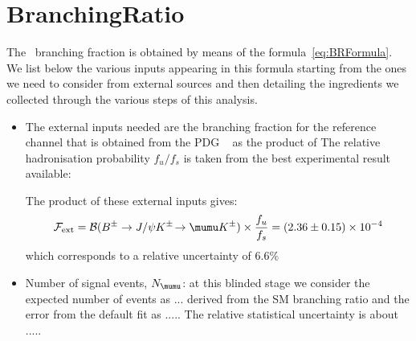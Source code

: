 \section{BranchingRatio}
\label{sec:BranchingRatio}

The \Bsmumu\ branching fraction is obtained by means of the
formula~\ref{eq:BRFormula}. We list below the various inputs
appearing in this formula starting from the ones we need to
consider from external sources and then detailing the ingredients
we collected through the various steps of this analysis.

\begin{itemize}
    \setlength{\itemsep}{0pt}%
    \setlength{\parskip}{0pt}%
\item The external inputs needed are the branching fraction for the
reference channel that is obtained from the PDG ~\cite{PDG2014}
as the product of 
The relative hadronisation probability $f_u/f_s$ is taken from 
the best experimental result~\cite{lhcbfsfu14} available:

The product of these external inputs gives:
\[
\mathcal{F}_{\mathrm{ext}} = \BR (\BpmKpmJpsi\! \to \mumu K^\pm)\times\frac{f_{u}}{f_{s}} = (2.36 \pm 0.15) \times 10^{-4} 
\]
which corresponds to a relative uncertainty of $6.6\%$

\item Number of signal events, $N_{\mumu}$: at this blinded stage we consider the expected
number of events as ... derived from the SM branching ratio and the error from
the default fit as ..... The relative statistical uncertainty is about .....


\end{itemize}
